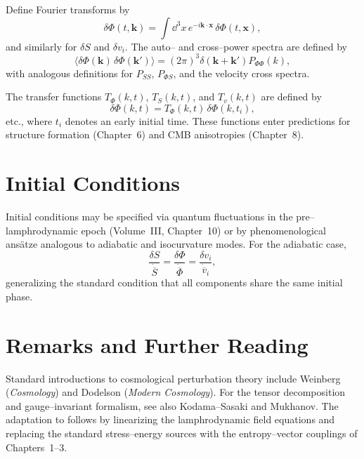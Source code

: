 Define Fourier transforms by
\[
\delta\Phi(t,\mathbf k)=\int\dd^3x\,e^{-i\mathbf k\cdot\mathbf x}\,
\delta\Phi(t,\mathbf x),
\]
and similarly for $\delta S$ and $\delta v_i$.  The auto-- and
cross--power spectra are defined by
\[
\langle \delta\Phi(\mathbf k)\,\delta\Phi(\mathbf k')\rangle
= (2\pi)^3\delta(\mathbf k+\mathbf k')P_{\Phi\Phi}(k),
\]
with analogous definitions for $P_{SS}$, $P_{\Phi S}$, and the
velocity cross spectra.

The transfer functions $T_\Phi(k,t)$, $T_S(k,t)$, and $T_v(k,t)$ are
defined by
\[
\delta\Phi(k,t)=T_\Phi(k,t)\,\delta\Phi(k,t_i),
\]
etc., where $t_i$ denotes an early initial time.  These functions enter
predictions for structure formation (Chapter~6) and CMB anisotropies
(Chapter~8).

\section{Initial Conditions}

Initial conditions may be specified via quantum fluctuations in the
pre--lamphrodynamic epoch (Volume~III, Chapter~10) or by phenomenological
ans\"atze analogous to adiabatic and isocurvature modes.  For the
adiabatic case,
\[
\frac{\delta S}{\dot{\overline S}}
= \frac{\delta\Phi}{\dot{\overline\Phi}}
= \frac{\delta v_i}{\dot{\overline v}_i},
\]
generalizing the standard condition that all components share the same
initial phase.

\section{Remarks and Further Reading}

Standard introductions to cosmological perturbation theory include
Weinberg (\emph{Cosmology}) and Dodelson (\emph{Modern Cosmology}).
For the tensor decomposition and gauge--invariant formalism, see also
Kodama--Sasaki and Mukhanov.  The adaptation to \rsvpabbr{} follows by
linearizing the lamphrodynamic field equations and replacing the
standard stress--energy sources with the entropy--vector couplings of
Chapters~1--3.

